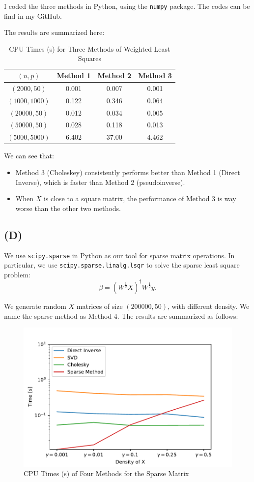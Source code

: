 \documentclass[a4paper,11pt]{article}
\begin{document}
I coded the three methods in Python, using the \texttt{numpy} package. The codes can be find in my GitHub.

The results are summarized here:

\begin{table}[!h]
\caption{CPU Times (s) for Three Methods of Weighted Least Squares}
\centering
\begin{tabular}{c c c c }
\firsthline
$(n,p)$&  Method 1 & Method 2 &Method 3  \\
\hline
$(2000,50)$& 0.001 & 0.007 & 0.001  \\
$(1000,1000)$ & 0.122 & 0.346 & 0.064  \\
$(20000,50)$ & 0.012 & 0.034 & 0.005  \\
$(50000,50)$ & 0.028& 0.118 & 0.013  \\
$(5000,5000)$ &  6.402 & 37.00 & 4.462\\
\hline
\end{tabular}
\end{table}

We can see that:
\begin{itemize}
	\item Method 3 (Choleskey) consistently performs better than Method 1 (Direct Inverse), which is faster than Method 2 (pseudoinverse). 
	\item When $X$ is close to a square matrix, the performance of Method 3 is way worse than the other two methods.
\end{itemize} 

\subsection{(D)}

We use \texttt{scipy.sparse} in Python as our tool for sparse matrix operations. In particular, we use \texttt{scipy.sparse.linalg.lsqr} to solve the sparse least square problem:
$$
\beta  = ({W}^{\frac{1}{2}}X)^\dagger {W}^{\frac{1}{2}} y.
$$

We generate random $X$ matrices of size $(200000,50)$, with different density. We name the sparse method as Method 4. The results are summarized as follows:

\begin{figure}[!h]
\caption{CPU Times (s) of Four Methods for the Sparse Matrix}
\centering
\includegraphics[width = \textwidth]{fig1}
\end{figure}
\end{document}
